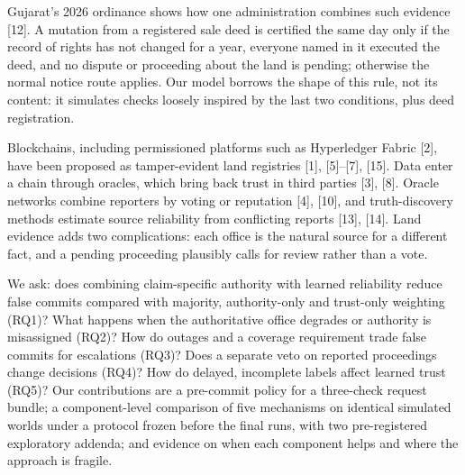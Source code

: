 \documentclass[10pt]{article}
\begin{document}
Gujarat's 2026 ordinance shows how one administration combines such evidence [12]. A mutation from a registered sale deed is certified the same day only if the record of rights has not changed for a year, everyone named in it executed the deed, and no dispute or proceeding about the land is pending; otherwise the normal notice route applies. Our model borrows the shape of this rule, not its content: it simulates checks loosely inspired by the last two conditions, plus deed registration.

Blockchains, including permissioned platforms such as Hyperledger Fabric [2], have been proposed as tamper-evident land registries [1], [5]--[7], [15]. Data enter a chain through oracles, which bring back trust in third parties [3], [8]. Oracle networks combine reporters by voting or reputation [4], [10], and truth-discovery methods estimate source reliability from conflicting reports [13], [14]. Land evidence adds two complications: each office is the natural source for a different fact, and a pending proceeding plausibly calls for review rather than a vote.

We ask: does combining claim-specific authority with learned reliability reduce false commits compared with majority, authority-only and trust-only weighting (RQ1)? What happens when the authoritative office degrades or authority is misassigned (RQ2)? How do outages and a coverage requirement trade false commits for escalations (RQ3)? Does a separate veto on reported proceedings change decisions (RQ4)? How do delayed, incomplete labels affect learned trust (RQ5)? Our contributions are a pre-commit policy for a three-check request bundle; a component-level comparison of five mechanisms on identical simulated worlds under a protocol frozen before the final runs, with two pre-registered exploratory addenda; and evidence on when each component helps and where the approach is fragile.
\end{document}
